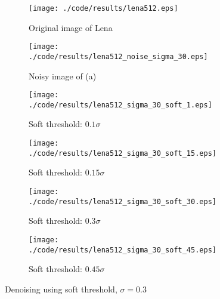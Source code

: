 \documentclass[journal,comsoc]{IEEEtran}
\begin{document}
\begin{figure}[!hbt]
  \centering
  \begin{subfigure}{.25\textwidth}
    \centering
    \texttt{[image: ./code/results/lena512.eps]}
    \caption{Original image of Lena}
    \label{subfig:original-image-of-lena}
  \end{subfigure}%
  \begin{subfigure}{.25\textwidth}
    \centering
    \texttt{[image: ./code/results/lena512\_noise\_sigma\_30.eps]}
    \caption{Noisy image of (a)}
    \label{subfig:sigma-10-noisy-image-of-a}
  \end{subfigure}

  \begin{subfigure}{0.25\textwidth}
    \centering{}
    \texttt{[image: ./code/results/lena512\_sigma\_30\_soft\_1.eps]}
    \caption{Soft threshold: $0.1\sigma$}
  \end{subfigure}%
  \begin{subfigure}{.25\textwidth}
    \centering{}
    \texttt{[image: ./code/results/lena512\_sigma\_30\_soft\_15.eps]}
    \caption{Soft threshold: $0.15\sigma$}
  \end{subfigure}

  \begin{subfigure}{0.25\textwidth}
    \centering{}
    \texttt{[image: ./code/results/lena512\_sigma\_30\_soft\_30.eps]}
    \caption{Soft threshold: $0.3\sigma$}
  \end{subfigure}%
  \begin{subfigure}{.25\textwidth}
    \centering{}
    \texttt{[image: ./code/results/lena512\_sigma\_30\_soft\_45.eps]}
    \caption{Soft threshold: $0.45\sigma$}
  \end{subfigure}
  
  \caption{Denoising using soft threshold, $\sigma=0.3$}
  \label{fig:sigma-30-soft-threshold}
\end{figure}
\end{document}
